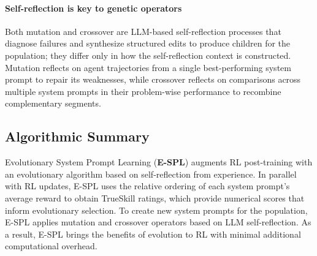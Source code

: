 \documentclass{article}
\theoremstyle{plain}
\theoremstyle{definition}
\theoremstyle{remark}
\begin{document}
\vspace{-5pt}
\paragraph{Self-reflection is key to genetic operators} Both mutation and crossover are LLM-based self-reflection processes that diagnose failures and synthesize structured edits to produce children for the population; they differ only in how the self-reflection context is constructed. Mutation reflects on agent trajectories from a single best-performing system prompt to repair its weaknesses, while crossover reflects on comparisons across multiple system prompts in their problem-wise performance to recombine complementary segments.

\subsection{Algorithmic Summary}
Evolutionary System Prompt Learning (\textbf{E-SPL}) augments RL post-training with an evolutionary algorithm based on self-reflection from experience. In parallel with RL updates, E-SPL uses the relative ordering of each system prompt's average reward to obtain TrueSkill ratings, which provide numerical scores that inform evolutionary selection. To create new system prompts for the population, E-SPL applies mutation and crossover operators based on LLM self-reflection. As a result, E-SPL brings the benefits of evolution to RL with minimal additional computational overhead.
\end{document}
